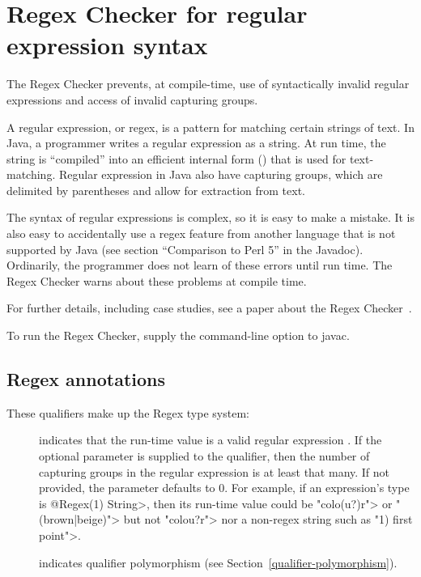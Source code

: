 \htmlhr
\chapter{Regex Checker for regular expression syntax\label{regex-checker}}

The Regex Checker prevents, at compile-time, use of syntactically invalid
regular expressions and access of invalid capturing groups.

A regular expression, or regex, is a pattern for matching certain strings
of text.  In Java, a programmer writes a regular expression as a string.
At run time, the string is ``compiled'' into an efficient internal form
() that is used for
text-matching. Regular expression in Java also have capturing groups, which
are delimited by parentheses and allow for extraction from text.

The syntax of regular expressions is complex, so it is easy to make a
mistake.  It is also easy to accidentally use a regex feature from another
language that is not supported by Java (see section ``Comparison to Perl
5'' in the  Javadoc).
Ordinarily, the programmer does not learn of these errors until run time.
The Regex Checker warns about these problems at compile time.

For further details, including case studies, see a paper about the Regex
Checker~\cite{SpishakDE2012}.

To run the Regex Checker, supply the
command-line option to javac.


\section{Regex annotations\label{regex-annotations}}

These qualifiers make up the Regex type system:

\begin{description}

\item[]
  indicates that the run-time value is a valid regular expression
  .  If the optional parameter is supplied to the qualifier,
  then the number of capturing groups in the regular expression is at least
  that many. If not provided, the parameter defaults to 0.
  For example, if an expression's type is \<@Regex(1) String>, then its
  run-time value could be \<"colo(u?)r"> or \<"(brown|beige)"> but not
  \<"colou?r"> nor a non-regex string such as \<"1) first point">.

\item[]
  indicates qualifier polymorphism (see Section~\ref{qualifier-polymorphism}).

\end{description}


